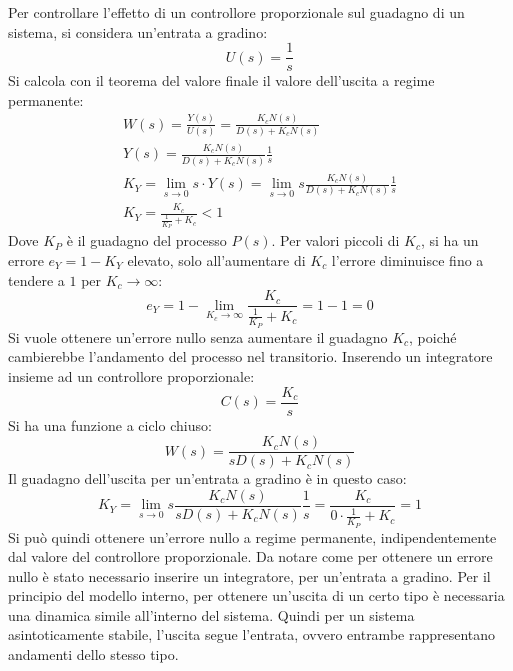 \documentclass{article}
\numberwithin{equation}{subsection}
\begin{document}
Per controllare l'effetto di un controllore proporzionale sul guadagno di un sistema, si considera un'entrata a gradino:
\begin{equation*}
    U(s)=\displaystyle\frac{1}{s}
\end{equation*}
Si calcola con il teorema del valore finale il valore dell'uscita a regime permanente:
\begin{gather*}
    W(s)=\displaystyle\frac{Y(s)}{U(s)}=\frac{K_cN(s)}{D(s)+K_cN(s)}\\
    Y(s)=\displaystyle\frac{K_c N(s)}{D(s)+K_c N(s)}\frac{1}{s}\\
    K_Y=\lim_{s\to0}s\cdot Y(s)=\lim_{s\to0}s\displaystyle\frac{K_c N(s)}{D(s)+K_c N(s)}\frac{1}{s}\\
    K_Y=\displaystyle\frac{K_c}{\displaystyle\frac{1}{K_P}+K_c}<1
\end{gather*}
Dove $K_P$ è il guadagno del processo $P(s)$. Per valori piccoli di $K_c$, si ha un errore $e_Y=1-K_Y$ elevato, solo all'aumentare di $K_c$ l'errore diminuisce fino a tendere 
a $1$ per $K_c\to\infty$: 
\begin{equation*}
    e_Y=1-\lim_{K_c\to\infty}\displaystyle\frac{K_c}{\displaystyle\frac{1}{K_P}+K_c}=1-1=0
\end{equation*}
Si vuole ottenere un'errore nullo senza aumentare il guadagno $K_c$, poiché cambierebbe l'andamento del processo nel transitorio. Inserendo un integratore insieme ad 
un controllore proporzionale:
\begin{equation}
    C(s)=\displaystyle\frac{K_c}{s}
\end{equation}
Si ha una funzione a ciclo chiuso:
\begin{equation}
    W(s)=\displaystyle\frac{K_cN(s)}{sD(s)+K_cN(s)}
\end{equation}
Il guadagno dell'uscita per un'entrata a gradino è in questo caso:
\begin{equation*}
    K_Y=\lim_{s\to0}s\displaystyle\frac{K_c N(s)}{sD(s)+K_c N(s)}\frac{1}{s}=\frac{K_c}{0\cdot\displaystyle\frac{1}{K_P}+K_c}=1
\end{equation*}
Si può quindi ottenere un'errore nullo a regime permanente, indipendentemente dal valore del controllore proporzionale. Da notare come per ottenere un errore nullo è stato 
necessario inserire un integratore, per un'entrata a gradino. Per il principio del modello interno, per ottenere un'uscita di un certo tipo è necessaria una dinamica 
simile all'interno del sistema. Quindi per un sistema asintoticamente stabile, l'uscita segue l'entrata, ovvero entrambe rappresentano andamenti dello stesso tipo. 
\end{document}
